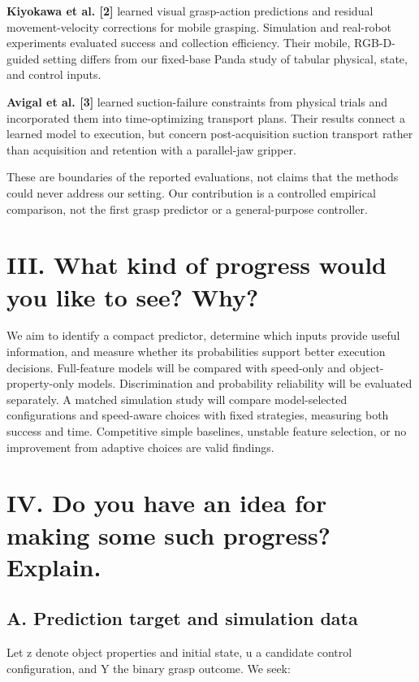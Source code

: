 \documentclass[11pt,letterpaper]{article}
\begin{document}
\textbf{Kiyokawa et al. [2]} learned visual grasp-action predictions and residual movement-velocity corrections for mobile grasping. Simulation and real-robot experiments evaluated success and collection efficiency. Their mobile, RGB-D-guided setting differs from our fixed-base Panda study of tabular physical, state, and control inputs.

\textbf{Avigal et al. [3]} learned suction-failure constraints from physical trials and incorporated them into time-optimizing transport plans. Their results connect a learned model to execution, but concern post-acquisition suction transport rather than acquisition and retention with a parallel-jaw gripper.

These are boundaries of the reported evaluations, not claims that the methods could never address our setting. Our contribution is a controlled empirical comparison, not the first grasp predictor or a general-purpose controller.

\section*{III. What kind of progress would you like to see? Why?}

We aim to identify a compact predictor, determine which inputs provide useful information, and measure whether its probabilities support better execution decisions. Full-feature models will be compared with speed-only and object-property-only models. Discrimination and probability reliability will be evaluated separately. A matched simulation study will compare model-selected configurations and speed-aware choices with fixed strategies, measuring both success and time. Competitive simple baselines, unstable feature selection, or no improvement from adaptive choices are valid findings.

\section*{IV. Do you have an idea for making some such progress? Explain.}

\subsection*{A. Prediction target and simulation data}

Let z denote object properties and initial state, u a candidate control configuration, and Y the binary grasp outcome. We seek:
\end{document}
